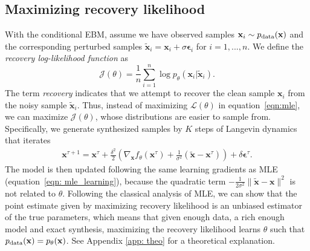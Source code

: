 \documentclass{article} \usepackage{iclr2021_conference,times}
\def\eqref#1{equation~\ref{#1}}
\def\rvx{{\mathbf{x}}}
\newcommand{\pdata}{p_{\rm{data}}}
\def\trvx{\tilde{\rvx}}
\def\beps{\bm{\epsilon}}
\begin{document}
\subsection{Maximizing recovery likelihood} \label{sect: learning}
With the conditional EBM, assume we have observed samples $\rvx_i \sim \pdata(\rvx)$ and the corresponding perturbed samples $\trvx_i = \rvx_i + \sigma \beps_i$ for $i = 1,...,n$. We define the \emph{recovery log-likelihood function} as
\begin{equation}
	\mathcal{J}(\theta) = \frac{1}{n} \sum_{i=1}^n \log p_\theta(\rvx_i|\trvx_i). 
\end{equation}
The term \emph{recovery} indicates that we attempt to recover the clean sample $\rvx_i$ from the noisy sample $\trvx_i$. Thus, instead of maximizing $\mathcal{L}(\theta)$ in \eqref{eqn:mle}, we can maximize $\mathcal{J}({\theta})$, whose distributions are easier to sample from. Specifically, we generate synthesized samples by $K$ steps of Langevin dynamics that iterates
\begin{eqnarray}
	\rvx^{\tau + 1} = \rvx^\tau + \frac{\delta^2}{2} (\nabla_{\rvx}f_\theta(\rvx^\tau) + \frac{1}{\sigma^2} (\trvx-\rvx^\tau)) + \delta \beps^\tau.
\end{eqnarray}
The model is then updated following the same learning gradients as MLE (\eqref{eqn: mle_learning}), because the quadratic term $- \frac{1}{2\sigma^2} \|\trvx-\rvx\|^2$ is not related to $\theta$. Following the classical analysis of MLE, we can show that the point estimate given by maximizing recovery likelihood is an unbiased estimator of the true parameters, which means that given enough data, a rich enough model and exact synthesis, maximizing the recovery likelihood learns $\theta$ such that $\pdata(\rvx) = p_\theta(\rvx)$. See Appendix \ref{app: theo} for a theoretical explanation.
\end{document}
